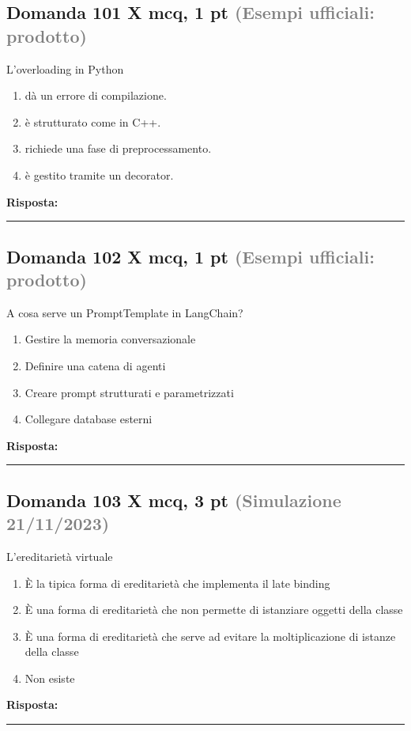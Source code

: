 \documentclass[a4paper,11pt]{article}
\begin{document}
\subsection*{Domanda 101 X \hfill {\small mcq, 1 pt \textcolor{gray}{(Esempi ufficiali: prodotto)}}}
L'overloading in Python

\begin{enumerate}[label=\alph*)]
\item dà un errore di compilazione.
\item è strutturato come in C++.
\item richiede una fase di preprocessamento.
\item è gestito tramite un decorator.
\end{enumerate}
\vspace{0.2cm}
\noindent\textbf{Risposta:}\par
\vspace{1.5cm}\hrule


\subsection*{Domanda 102 X \hfill {\small mcq, 1 pt \textcolor{gray}{(Esempi ufficiali: prodotto)}}}
A cosa serve un PromptTemplate in LangChain?

\begin{enumerate}[label=\alph*)]
\item Gestire la memoria conversazionale
\item Definire una catena di agenti
\item Creare prompt strutturati e parametrizzati
\item Collegare database esterni
\end{enumerate}
\vspace{0.2cm}
\noindent\textbf{Risposta:}\par
\vspace{1.5cm}\hrule


\subsection*{Domanda 103 X \hfill {\small mcq, 3 pt \textcolor{gray}{(Simulazione 21/11/2023)}}}
L'ereditarietà virtuale

\begin{enumerate}[label=\alph*)]
\item È la tipica forma di ereditarietà che implementa il late binding
\item È una forma di ereditarietà che non permette di istanziare oggetti della classe
\item È una forma di ereditarietà che serve ad evitare la moltiplicazione di istanze della classe
\item Non esiste
\end{enumerate}
\vspace{0.2cm}
\noindent\textbf{Risposta:}\par
\vspace{1.5cm}\hrule
\end{document}
